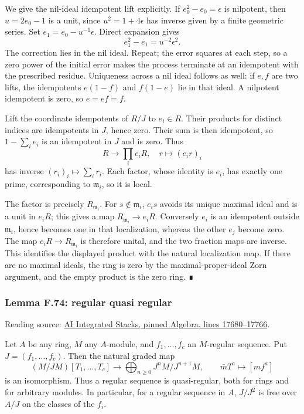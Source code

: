 \documentclass[11pt,a4paper,openany]{report}
\begin{document}
We give the nil-ideal idempotent lift explicitly. If \(e_0^2-e_0=\epsilon\) is nilpotent, then \(u=2e_0-1\) is a unit, since \(u^2=1+4\epsilon\) has inverse given by a finite geometric series. Set \(e_1=e_0-u^{-1}\epsilon\). Direct expansion gives \[e_1^2-e_1=u^{-2}\epsilon^2.\] The correction lies in the nil ideal. Repeat; the error squares at each step, so a zero power of the initial error makes the process terminate at an idempotent with the prescribed residue. Uniqueness across a nil ideal follows as well: if \(e,f\) are two lifts, the idempotents \(e(1-f)\) and \(f(1-e)\) lie in that ideal. A nilpotent idempotent is zero, so \(e=ef=f\).

Lift the coordinate idempotents of \(R/J\) to \(e_i\in R\). Their products for distinct indices are idempotents in \(J\), hence zero. Their sum is then idempotent, so \(1-\sum_i e_i\) is an idempotent in \(J\) and is zero. Thus \[R\longrightarrow\prod_i e_iR,\quad r\longmapsto(e_ir)_i\] has inverse \((r_i)_i\mapsto\sum_i r_i\). Each factor, whose identity is \(e_i\), has exactly one prime, corresponding to \(\mathfrak m_i\), so it is local.

The factor is precisely \(R_{\mathfrak m_i}\). For \(s\notin\mathfrak m_i\), \(e_is\) avoids its unique maximal ideal and is a unit in \(e_iR\); this gives a map \(R_{\mathfrak m_i}\to e_iR\). Conversely \(e_i\) is an idempotent outside \(\mathfrak m_i\), hence becomes one in that localization, whereas the other \(e_j\) become zero. The map \(e_iR\to R_{\mathfrak m_i}\) is therefore unital, and the two fraction maps are inverse. This identifies the displayed product with the natural localization map. If there are no maximal ideals, the ring is zero by the maximal-proper-ideal Zorn argument, and the empty product is the zero ring. ∎

\label{AG-RG-S05-algebra-lemma-regular-quasi-regular}

\subsubsection{Lemma F.74: regular quasi regular}\label{AG-RG-S05-lemma-f.74-regular-quasi-regular}

Reading source: \href{https://github.com/KokunoYumeto/unofficial-stacks-project-ai-drafts/blob/565b10e987aba5969b21145a0833f42d69f96790/algebra.tex\#L17680-L17766}{AI Integrated Stacks, pinned Algebra, lines 17680--17766}.

Let \(A\) be any ring, \(M\) any \(A\)-module, and \(f_1,\ldots,f_c\) an \(M\)-regular sequence. Put \(J=(f_1,\ldots,f_c)\). Then the natural graded map \[
(M/JM)[T_1,\ldots,T_c]\longrightarrow
\bigoplus_{n\geq0}J^nM/J^{n+1}M,\qquad
\bar mT^a\longmapsto[mf^a]
\] is an isomorphism. Thus a regular sequence is quasi-regular, both for rings and for arbitrary modules. In particular, for a regular sequence in \(A\), \(J/J^2\) is free over \(A/J\) on the classes of the \(f_i\).
\end{document}
